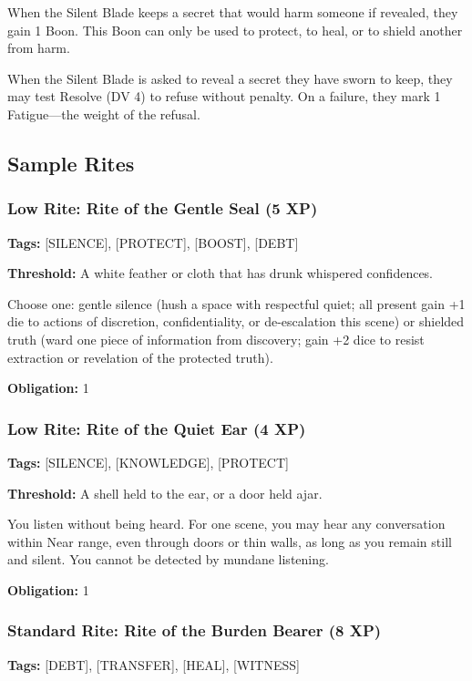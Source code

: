 When the Silent Blade keeps a secret that would harm someone if revealed, they gain 1 Boon. This Boon can only be used to protect, to heal, or to shield another from harm.

When the Silent Blade is asked to reveal a secret they have sworn to keep, they may test Resolve (DV 4) to refuse without penalty. On a failure, they mark 1 Fatigue—the weight of the refusal.

\subsection{Sample Rites}

\subsubsection{Low Rite: Rite of the Gentle Seal (5 XP)}

\textbf{Tags:} [SILENCE], [PROTECT], [BOOST], [DEBT]

\textbf{Threshold:} A white feather or cloth that has drunk whispered confidences.

Choose one: gentle silence (hush a space with respectful quiet; all present gain +1 die to actions of discretion, confidentiality, or de-escalation this scene) or shielded truth (ward one piece of information from discovery; gain +2 dice to resist extraction or revelation of the protected truth).

\textbf{Obligation:} 1

\subsubsection{Low Rite: Rite of the Quiet Ear (4 XP)}

\textbf{Tags:} [SILENCE], [KNOWLEDGE], [PROTECT]

\textbf{Threshold:} A shell held to the ear, or a door held ajar.

You listen without being heard. For one scene, you may hear any conversation within Near range, even through doors or thin walls, as long as you remain still and silent. You cannot be detected by mundane listening.

\textbf{Obligation:} 1

\subsubsection{Standard Rite: Rite of the Burden Bearer (8 XP)}

\textbf{Tags:} [DEBT], [TRANSFER], [HEAL], [WITNESS]

